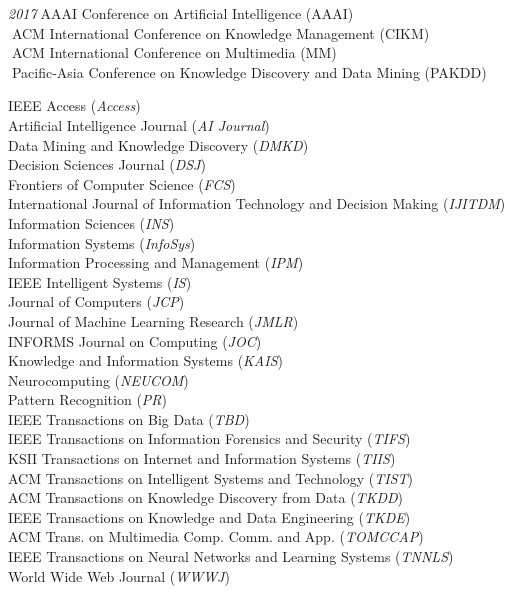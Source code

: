 \documentclass[10pt]{article}
\newenvironment{myindentpar}[1]%
{\begin{list}{}%
         {\setlength{\leftmargin}{#1}}%
         \item[]%
}
{\end{list}}
\newcounter{list}
\begin{document}
\begin{myindentpar}{0.75cm}
{\hspace{-0.75cm}\emph{2017}\textcolor{white}{.}AAAI Conference on Artificial Intelligence (AAAI) \\
\textcolor{white}{.}ACM International Conference on Knowledge Management (CIKM) \\
\textcolor{white}{.}ACM International Conference on Multimedia (MM) \\
\textcolor{white}{.}Pacific-Asia Conference on Knowledge Discovery and Data Mining (PAKDD)

}

\hspace{-0.75cm}{\bf Journal Reviewer}

{\small

IEEE Access (\textit{Access}) \\
Artificial Intelligence Journal (\textit{AI Journal}) \\
Data Mining and Knowledge Discovery (\textit{DMKD}) \\
Decision Sciences Journal (\textit{DSJ}) \\
Frontiers of Computer Science (\textit{FCS}) \\
International Journal of Information Technology and Decision Making (\textit{IJITDM}) \\
Information Sciences (\textit{INS}) \\
Information Systems (\textit{InfoSys}) \\
Information Processing and Management (\textit{IPM}) \\
IEEE Intelligent Systems (\textit{IS}) \\
Journal of Computers (\textit{JCP}) \\
Journal of Machine Learning Research (\textit{JMLR}) \\
INFORMS Journal on Computing (\textit{JOC}) \\
Knowledge and Information Systems (\textit{KAIS}) \\
Neurocomputing (\textit{NEUCOM}) \\
Pattern Recognition (\textit{PR}) \\
IEEE Transactions on Big Data (\textit{TBD}) \\
IEEE Transactions on Information Forensics and Security (\textit{TIFS}) \\
KSII Transactions on Internet and Information Systems (\textit{TIIS}) \\
ACM Transactions on Intelligent Systems and Technology (\textit{TIST}) \\
ACM Transactions on Knowledge Discovery from Data (\textit{TKDD}) \\
IEEE Transactions on Knowledge and Data Engineering (\textit{TKDE}) \\
ACM Trans. on Multimedia Comp. Comm. and App. (\textit{TOMCCAP}) \\
IEEE Transactions on Neural Networks and Learning Systems (\textit{TNNLS}) \\
World Wide Web Journal (\textit{WWWJ})

}


\end{myindentpar}
\end{document}
